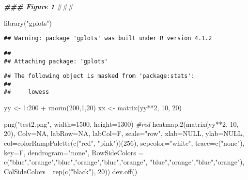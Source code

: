 \documentclass[
]{article}
\newenvironment{Shaded}{\begin{snugshade}}{\end{snugshade}}
\newcommand{\AlertTok}[1]{\textcolor[rgb]{0.94,0.16,0.16}{#1}}
\newcommand{\AttributeTok}[1]{\textcolor[rgb]{0.77,0.63,0.00}{#1}}
\newcommand{\CommentTok}[1]{\textcolor[rgb]{0.56,0.35,0.01}{\textit{#1}}}
\newcommand{\ConstantTok}[1]{\textcolor[rgb]{0.00,0.00,0.00}{#1}}
\newcommand{\DecValTok}[1]{\textcolor[rgb]{0.00,0.00,0.81}{#1}}
\newcommand{\DocumentationTok}[1]{\textcolor[rgb]{0.56,0.35,0.01}{\textbf{\textit{#1}}}}
\newcommand{\FunctionTok}[1]{\textcolor[rgb]{0.00,0.00,0.00}{#1}}
\newcommand{\NormalTok}[1]{#1}
\newcommand{\OtherTok}[1]{\textcolor[rgb]{0.56,0.35,0.01}{#1}}
\newcommand{\SpecialCharTok}[1]{\textcolor[rgb]{0.00,0.00,0.00}{#1}}
\newcommand{\StringTok}[1]{\textcolor[rgb]{0.31,0.60,0.02}{#1}}
\begin{document}
\begin{Shaded}
\begin{Highlighting}[]
\DocumentationTok{\#\#\# Figure 1 }\AlertTok{\#\#\#}

\FunctionTok{library}\NormalTok{(}\StringTok{"gplots"}\NormalTok{)}
\end{Highlighting}
\end{Shaded}

\begin{verbatim}
## Warning: package 'gplots' was built under R version 4.1.2
\end{verbatim}

\begin{verbatim}
## 
## Attaching package: 'gplots'
\end{verbatim}

\begin{verbatim}
## The following object is masked from 'package:stats':
## 
##     lowess
\end{verbatim}

\begin{Shaded}
\begin{Highlighting}[]
\NormalTok{yy }\OtherTok{\textless{}{-}} \DecValTok{1}\SpecialCharTok{:}\DecValTok{200} \SpecialCharTok{+} \FunctionTok{rnorm}\NormalTok{(}\DecValTok{200}\NormalTok{,}\DecValTok{1}\NormalTok{,}\DecValTok{20}\NormalTok{)}
\NormalTok{xx }\OtherTok{\textless{}{-}} \FunctionTok{matrix}\NormalTok{(yy}\SpecialCharTok{**}\DecValTok{2}\NormalTok{, }\DecValTok{10}\NormalTok{, }\DecValTok{20}\NormalTok{)}

\FunctionTok{png}\NormalTok{(}\StringTok{"test2.png"}\NormalTok{, }\AttributeTok{width=}\DecValTok{1500}\NormalTok{, }\AttributeTok{height=}\DecValTok{1300}\NormalTok{) }\CommentTok{\#red}
\FunctionTok{heatmap.2}\NormalTok{(}\FunctionTok{matrix}\NormalTok{(yy}\SpecialCharTok{**}\DecValTok{2}\NormalTok{, }\DecValTok{10}\NormalTok{, }\DecValTok{20}\NormalTok{), }\AttributeTok{Colv=}\ConstantTok{NA}\NormalTok{, }\AttributeTok{labRow=}\ConstantTok{NA}\NormalTok{, }\AttributeTok{labCol=}\NormalTok{F, }\AttributeTok{scale=}\StringTok{"row"}\NormalTok{, }
        \AttributeTok{xlab=}\ConstantTok{NULL}\NormalTok{, }\AttributeTok{ylab=}\ConstantTok{NULL}\NormalTok{, }\AttributeTok{col=}\FunctionTok{colorRampPalette}\NormalTok{(}\FunctionTok{c}\NormalTok{(}\StringTok{"red"}\NormalTok{, }\StringTok{"pink"}\NormalTok{))(}\DecValTok{256}\NormalTok{),  }
        \AttributeTok{sepcolor=}\StringTok{"white"}\NormalTok{, }\AttributeTok{trace=}\FunctionTok{c}\NormalTok{(}\StringTok{"none"}\NormalTok{), }\AttributeTok{key=}\NormalTok{F, }\AttributeTok{dendrogram=}\StringTok{"none"}\NormalTok{,}
        \AttributeTok{RowSideColors =} \FunctionTok{c}\NormalTok{(}\StringTok{"blue"}\NormalTok{,}\StringTok{"orange"}\NormalTok{,}\StringTok{"blue"}\NormalTok{,}\StringTok{"orange"}\NormalTok{,}\StringTok{"blue"}\NormalTok{,}\StringTok{"orange"}\NormalTok{,}
               \StringTok{"blue"}\NormalTok{,}\StringTok{"orange"}\NormalTok{,}\StringTok{"blue"}\NormalTok{,}\StringTok{"orange"}\NormalTok{),}
        \AttributeTok{ColSideColors=}  \FunctionTok{rep}\NormalTok{(}\FunctionTok{c}\NormalTok{(}\StringTok{"black"}\NormalTok{), }\DecValTok{20}\NormalTok{))}
\FunctionTok{dev.off}\NormalTok{()}
\end{Highlighting}
\end{Shaded}
\end{document}

